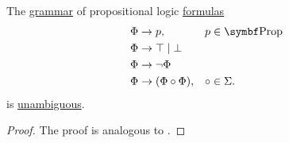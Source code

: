 \begin{proposition}\label{thm:propositional_formulas_are_unambiguous}
  The \hyperref[def:grammar]{grammar} of propositional logic \hyperref[def:propositional_logic_language]{formulas}
  \begin{displaymath}
    \begin{aligned}
      &\Phi \to p,                 &&p \in \Cat{Prop} \\
      &\Phi \to \top \;|\; \bot    && \\
      &\Phi \to \neg \Phi          && \\
      &\Phi \to (\Phi \circ \Phi), &&\circ \in \Sigma.
    \end{aligned}
  \end{displaymath}
  is \hyperref[def:ambiguous_grammar]{unambiguous}.
\end{proposition}
\begin{proof}
  The proof is analogous to .
\end{proof}

